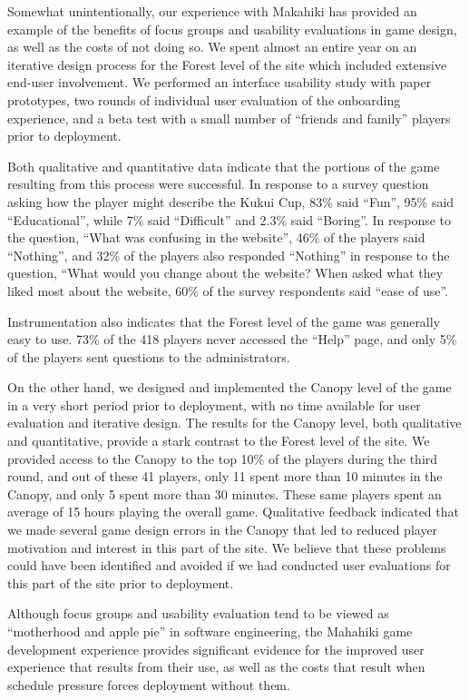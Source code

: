 \documentclass{acm_proc_article-sp}
\begin{document}
Somewhat unintentionally, our experience with Makahiki has provided an
example of the benefits of focus groups and usability evaluations in game
design, as well as the costs of not doing so.  We spent almost an entire
year on an iterative design process for the Forest level of the site which
included extensive end-user involvement.  We performed an interface
usability study with paper prototypes, two rounds of individual user
evaluation of the onboarding experience, and a beta test with a small
number of ``friends and family'' players prior to deployment.

Both qualitative and quantitative data indicate that the portions of the
game resulting from this process were successful.  In response to a survey
question asking how the player might describe the Kukui Cup, 83\% said
``Fun'', 95\% said ``Educational'', while 7\% said ``Difficult'' and 2.3\%
said ``Boring''.  In response to the question, ``What was confusing in the
website'', 46\% of the players said ``Nothing'', and 32\% of the players also
responded ``Nothing'' in response to the question, ``What would you change
about the website? When asked what they liked most about the website, 60\%
of the survey respondents said ``ease of use''.

Instrumentation also indicates that the Forest level of the game was generally easy to
use. 73\% of the 418 players never accessed the ``Help'' page, and only 5\%
of the players sent questions to the administrators.

On the other hand, we designed and implemented the Can\-opy level of the
game in a very short period prior to deployment, with no time available
for user evaluation and iterative design.  The results for the Canopy
level, both qualitative and quantitative, provide a stark contrast to the
Forest level of the site.  We provided access to the Canopy to the top
10\% of the players during the third round, and out of these 41 players,
only 11 spent more than 10 minutes in the Canopy, and only 5 spent more
than 30 minutes. These same players spent an average of 15 hours playing the
overall game.  Qualitative feedback indicated that we made several game
design errors in the Canopy that led to reduced player motivation and
interest in this part of the site.  We believe that these problems could
have been identified and avoided if we had conducted user evaluations for
this part of the site prior to deployment.

Although focus groups and usability evaluation tend to be viewed as
``motherhood and apple pie'' in software engineering, the Mahahiki game
development experience provides significant evidence for the improved user
experience that results from their use, as well as the costs that result
when schedule pressure forces deployment without them.
\end{document}
